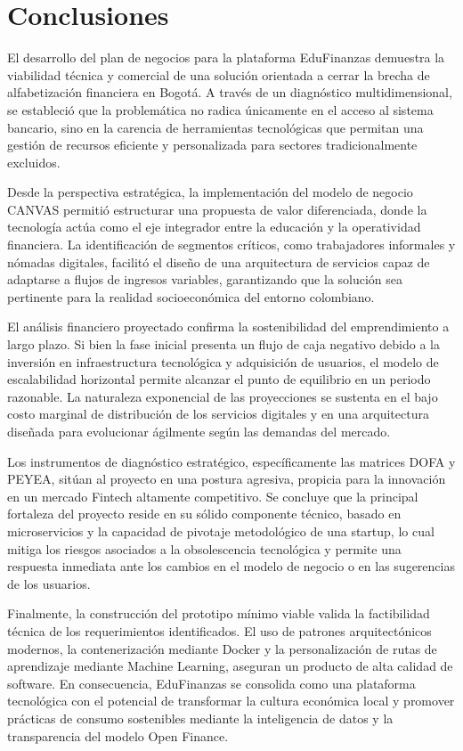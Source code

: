 \section*{Conclusiones}

El desarrollo del plan de negocios para la plataforma EduFinanzas demuestra la viabilidad técnica y comercial de una solución orientada a cerrar la brecha de alfabetización financiera en Bogotá. A través de un diagnóstico multidimensional, se estableció que la problemática no radica únicamente en el acceso al sistema bancario, sino en la carencia de herramientas tecnológicas que permitan una gestión de recursos eficiente y personalizada para sectores tradicionalmente excluidos.

Desde la perspectiva estratégica, la implementación del modelo de negocio CANVAS permitió estructurar una propuesta de valor diferenciada, donde la tecnología actúa como el eje integrador entre la educación y la operatividad financiera. La identificación de segmentos críticos, como trabajadores informales y nómadas digitales, facilitó el diseño de una arquitectura de servicios capaz de adaptarse a flujos de ingresos variables, garantizando que la solución sea pertinente para la realidad socioeconómica del entorno colombiano.

El análisis financiero proyectado confirma la sostenibilidad del emprendimiento a largo plazo. Si bien la fase inicial presenta un flujo de caja negativo debido a la inversión en infraestructura tecnológica y adquisición de usuarios, el modelo de escalabilidad horizontal permite alcanzar el punto de equilibrio en un periodo razonable. La naturaleza exponencial de las proyecciones se sustenta en el bajo costo marginal de distribución de los servicios digitales y en una arquitectura diseñada para evolucionar ágilmente según las demandas del mercado.

Los instrumentos de diagnóstico estratégico, específicamente las matrices DOFA y PEYEA, sitúan al proyecto en una postura agresiva, propicia para la innovación en un mercado Fintech altamente competitivo. Se concluye que la principal fortaleza del proyecto reside en su sólido componente técnico, basado en microservicios y la capacidad de pivotaje metodológico de una startup, lo cual mitiga los riesgos asociados a la obsolescencia tecnológica y permite una respuesta inmediata ante los cambios en el modelo de negocio o en las sugerencias de los usuarios.

Finalmente, la construcción del prototipo mínimo viable valida la factibilidad técnica de los requerimientos identificados. El uso de patrones arquitectónicos modernos, la contenerización mediante Docker y la personalización de rutas de aprendizaje mediante Machine Learning, aseguran un producto de alta calidad de software. En consecuencia, EduFinanzas se consolida como una plataforma tecnológica con el potencial de transformar la cultura económica local y promover prácticas de consumo sostenibles mediante la inteligencia de datos y la transparencia del modelo Open Finance.